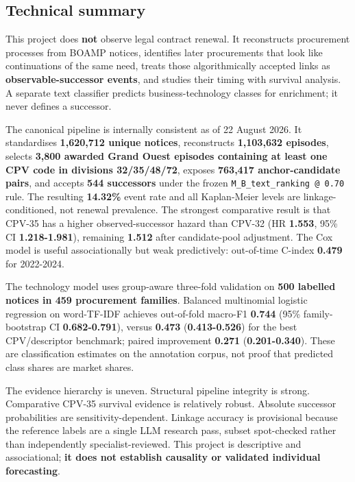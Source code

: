 \subsection{Technical summary}\label{technical-summary}

This project does \textbf{not} observe legal contract renewal. It
reconstructs procurement processes from BOAMP notices, identifies later
procurements that look like continuations of the same need, treats those
algorithmically accepted links as \textbf{observable-successor events},
and studies their timing with survival analysis. A separate text
classifier predicts business-technology classes for enrichment; it never
defines a successor.

The canonical pipeline is internally consistent as of 22 August 2026. It
standardises \textbf{1,620,712 unique notices}, reconstructs
\textbf{1,103,632 episodes}, selects \textbf{3,800 awarded Grand Ouest
episodes containing at least one CPV code in divisions 32/35/48/72},
exposes \textbf{763,417 anchor-candidate pairs}, and accepts \textbf{544
successors} under the frozen \texttt{M\_B\_text\_ranking\ @\ 0.70} rule.
The resulting \textbf{14.32\%} event rate and all Kaplan-Meier levels
are linkage-conditioned, not renewal prevalence. The strongest
comparative result is that CPV-35 has a higher observed-successor hazard
than CPV-32 (HR \textbf{1.553}, 95\% CI \textbf{1.218-1.981}), remaining
\textbf{1.512} after candidate-pool adjustment. The Cox model is useful
associationally but weak predictively: out-of-time C-index
\textbf{0.479} for 2022-2024.

The technology model uses group-aware three-fold validation on
\textbf{500 labelled notices in 459 procurement families}. Balanced
multinomial logistic regression on word-TF-IDF achieves out-of-fold
macro-F1 \textbf{0.744} (95\% family-bootstrap CI \textbf{0.682-0.791}),
versus \textbf{0.473} (\textbf{0.413-0.526}) for the best CPV/descriptor
benchmark; paired improvement \textbf{0.271} (\textbf{0.201-0.340}).
These are classification estimates on the annotation corpus, not proof
that predicted class shares are market shares.

The evidence hierarchy is uneven. Structural pipeline integrity is
strong. Comparative CPV-35 survival evidence is relatively robust.
Absolute successor probabilities are sensitivity-dependent. Linkage
accuracy is provisional because the reference labels are a single LLM
research pass, subset spot-checked rather than independently
specialist-reviewed. This project is descriptive and associational;
\textbf{it does not establish causality or validated individual
forecasting}.

